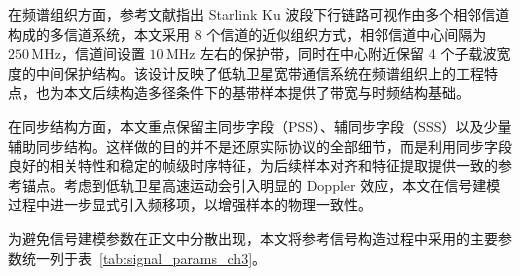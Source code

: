 在频谱组织方面，参考文献指出 Starlink Ku 波段下行链路可视作由多个相邻信道构成的多信道系统，本文采用 8 个信道的近似组织方式，相邻信道中心间隔为 \(250\,\mathrm{MHz}\)，信道间设置 \(10\,\mathrm{MHz}\) 左右的保护带，同时在中心附近保留 4 个子载波宽度的中间保护结构。该设计反映了低轨卫星宽带通信系统在频谱组织上的工程特点，也为本文后续构造多径条件下的基带样本提供了带宽与时频结构基础。

在同步结构方面，本文重点保留主同步字段（PSS）、辅同步字段（SSS）以及少量辅助同步结构。这样做的目的并不是还原实际协议的全部细节，而是利用同步字段良好的相关特性和稳定的帧级时序特征，为后续样本对齐和特征提取提供一致的参考锚点。考虑到低轨卫星高速运动会引入明显的 Doppler 效应，本文在信号建模过程中进一步显式引入频移项，以增强样本的物理一致性。

为避免信号建模参数在正文中分散出现，本文将参考信号构造过程中采用的主要参数统一列于表~\ref{tab:signal_params_ch3}。

